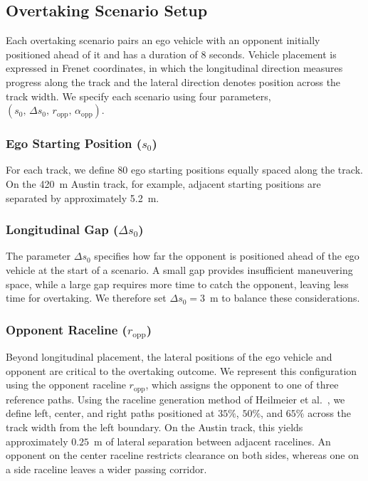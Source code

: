 \documentclass[letterpaper,10 pt,conference]{ieeeconf}
\begin{document}
\subsection{Overtaking Scenario Setup}

Each overtaking scenario pairs an ego vehicle with an opponent initially positioned ahead of it and has a duration of 8 seconds. Vehicle placement is expressed in Frenet coordinates, in which the longitudinal direction measures progress along the track and the lateral direction denotes position across the track width. We specify each scenario using four parameters, \(\left(s_0,\,\Delta s_0,\,r_{\mathrm{opp}},\,\alpha_{\mathrm{opp}}\right)\).

\subsubsection{Ego Starting Position (\(s_0\))}
For each track, we define 80 ego starting positions equally spaced along the track. On the 420~m Austin track, for example, adjacent starting positions are separated by approximately 5.2~m.

\subsubsection{Longitudinal Gap (\(\Delta s_0\))}
The parameter \(\Delta s_0\) specifies how far the opponent is positioned ahead of the ego vehicle at the start of a scenario. A small gap provides insufficient maneuvering space, while a large gap requires more time to catch the opponent, leaving less time for overtaking. We therefore set \(\Delta s_0=3\)~m to balance these considerations.

\subsubsection{Opponent Raceline (\(r_{\mathrm{opp}}\))}
Beyond longitudinal placement, the lateral positions of the ego vehicle and opponent are critical to the overtaking outcome. We represent this configuration using the opponent raceline \(r_{\mathrm{opp}}\), which assigns the opponent to one of three reference paths. Using the raceline generation method of Heilmeier et al.~\cite{Heilmeier02102020}, we define left, center, and right paths positioned at \(35\%\), \(50\%\), and \(65\%\) across the track width from the left boundary. On the Austin track, this yields approximately \(0.25\)~m of lateral separation between adjacent racelines. An opponent on the center raceline restricts clearance on both sides, whereas one on a side raceline leaves a wider passing corridor.
\end{document}
